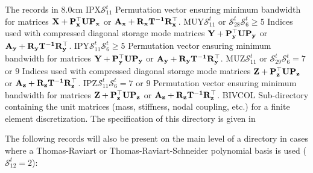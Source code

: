 \begin{DescriptionEnregistrement}{The  records in
}{8.0cm}
\IntEnr
  {IPX}{$\mathcal{S}^{t}_{11}$}
  {Permutation vector ensuring minimum bandwidth for matrices $\bf{X}+\bf{P}_x^\top \bf{U}\bf{P}_x$ or $\bf{A}_x+\bf{R}_x\bf{T}^{-1}\bf{R}_x^\top$.} 
\OptIntEnr
  {MUY}{$\mathcal{S}^{t}_{11}$ or $\mathcal{S}^{t}_{28}$}{$\mathcal{S}^{t}_{6}\ge 5$}
  {Indices used with compressed diagonal storage mode matrices $\bf{Y}+\bf{P}_y^\top \bf{U}\bf{P}_y$ or $\bf{A}_y+\bf{R}_y\bf{T}^{-1}\bf{R}_y^\top$.} 
\OptIntEnr
  {IPY}{$\mathcal{S}^{t}_{11}$}{$\mathcal{S}^{t}_{6}\ge 5$}
  {Permutation vector ensuring minimum bandwidth for matrices $\bf{Y}+\bf{P}_y^\top \bf{U}\bf{P}_y$ or $\bf{A}_y+\bf{R}_y\bf{T}^{-1}\bf{R}_y^\top$.} 
\OptIntEnr
  {MUZ}{$\mathcal{S}^{t}_{11}$ or $\mathcal{S}^{t}_{29}$}{$\mathcal{S}^{t}_{6}=7$ or $9$}
  {Indices used with compressed diagonal storage mode matrices $\bf{Z}+\bf{P}_z^\top \bf{U}\bf{P}_z$ or $\bf{A}_z+\bf{R}_z\bf{T}^{-1}\bf{R}_z^\top$.} 
\OptIntEnr
  {IPZ}{$\mathcal{S}^{t}_{11}$}{$\mathcal{S}^{t}_{6}=7$ or $9$}
  {Permutation vector ensuring minimum bandwidth for matrices $\bf{Z}+\bf{P}_z^\top \bf{U}\bf{P}_z$ or $\bf{A}_z+\bf{R}_z\bf{T}^{-1}\bf{R}_z^\top$.} 
\DirEnr
  {BIVCOL}
  {Sub-directory containing the unit matrices (mass, stiffness, nodal coupling,
   etc.) for a finite element discretization.
  The specification of this directory is given in }
\end{DescriptionEnregistrement}

The following records will also be present on the main level of a 
directory in cases where a Thomas-Raviart or Thomas-Raviart-Schneider polynomial basis is used ($\mathcal{S}^{t}_{12}=2$):

